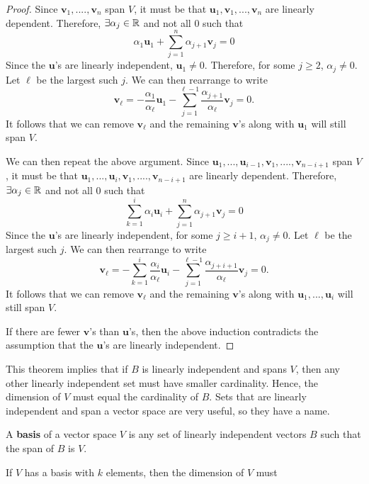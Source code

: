 \begin{proof}
  Since $\mathbf{v}_1, ...., \mathbf{v}_n$ span $V$, it must be that 
  $\mathbf{u}_1, \mathbf{v}_1, ... , \mathbf{v}_n$ are linearly
  dependent. Therefore, $\exists \alpha_j \in \mathbb{R}$ and not all $0$ such that 
  \[ \alpha_1 \mathbf{u}_1 + \sum_{j=1}^n \alpha_{j+1} \mathbf{v}_j =
  0 \]
  Since the $\mathbf{u}$'s are linearly independent, $\mathbf{u}_1
  \neq 0$. Therefore, for some $j \geq 2$, $\alpha_j \neq 0$. Let
  $\ell$ be the largest such $j$. We can then rearrange to write
  \[ \mathbf{v}_\ell = -\frac{\alpha_1}{\alpha_\ell} \mathbf{u}_1 -
  \sum_{j=1}^{\ell-1} \frac{\alpha_{j+1}}{\alpha_\ell} \mathbf{v}_j = 0. \]
  It follows that we can remove $\mathbf{v}_\ell$ and the remaining
  $\mathbf{v}$'s along with $\mathbf{u}_1$ will still span $V$. 

  We can then repeat the above argument.  Since $\mathbf{u}_1, ...,
  \mathbf{u}_{i-1}, \mathbf{v}_1, ...., \mathbf{v}_{n-i+1}$ span $V$,
  it must be that $\mathbf{u}_1, ...,
  \mathbf{u}_{i}, \mathbf{v}_1, ...., \mathbf{v}_{n-i+1}$ are
  linearly dependent. Therefore, $\exists \alpha_j \in \mathbb{R}$ and not all
  $0$ such that
  \[ \sum_{k=1}^i \alpha_i \mathbf{u}_i + \sum_{j=1}^n \alpha_{j+1}
  \mathbf{v}_j = 0 \] 
  Since the $\mathbf{u}$'s are linearly
  independent, for some $j \geq i+1$, $\alpha_j \neq 0$. Let $\ell$ be
  the largest such $j$. We can then rearrange to write
  \[ \mathbf{v}_\ell = -\sum_{k=1}^i \frac{\alpha_i}{\alpha_\ell} \mathbf{u}_i -
  \sum_{j=1}^{\ell-1} \frac{\alpha_{j+i+1}}{\alpha_\ell} \mathbf{v}_j = 0. \]
  It follows that we can remove $\mathbf{v}_\ell$ and the remaining
  $\mathbf{v}$'s along with $\mathbf{u}_1, ... , \mathbf{u}_i$ will
  still span $V$. 

  If there are fewer $\mathbf{v}$'s than $\mathbf{u}$'s, then the
  above induction contradicts the assumption that the $\mathbf{u}$'s
  are linearly independent.
\end{proof}
This theorem implies that if $B$ is linearly independent and spans
$V$, then any other linearly independent set must have smaller
cardinality. Hence, the dimension of $V$ must equal the cardinality of
$B$. Sets that are linearly independent and span a vector space are
very useful, so they have a name.
\begin{definition}
  A \textbf{basis} of a vector space $V$ is any set of linearly
  independent vectors $B$ such that the span of $B$ is $V$.
\end{definition}
If $V$ has a basis with $k$ elements, then the dimension of $V$ must
